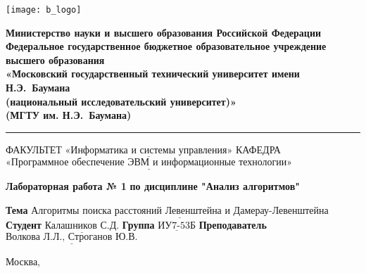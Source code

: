 \thispagestyle{empty}

\noindent \begin{minipage}{0.15\textwidth}
	\texttt{[image: b\_logo]}
\end{minipage}
\noindent\begin{minipage}{0.8\textwidth}\centering
	\textbf{Министерство науки и высшего образования Российской Федерации}\\
	\textbf{Федеральное государственное бюджетное образовательное учреждение высшего образования}\\
	\textbf{«Московский государственный технический университет имени Н.Э.~Баумана}\\
	\textbf{(национальный исследовательский университет)»}\\
	\textbf{(МГТУ им. Н.Э.~Баумана)}
\end{minipage}

\noindent\rule{18cm}{3pt}
\newline\newline
\noindent ФАКУЛЬТЕТ $\underline{\text{«Информатика и системы управления»}}$ \newline\newline
\noindent КАФЕДРА $\underline{\text{«Программное обеспечение ЭВМ и информационные технологии»}}$\newline\newline\newline


\begin{center}
	\noindent\begin{minipage}{1.3\textwidth}\centering
		\Large\textbf{  Лабораторная работа № 1}\newline
		\textbf{по дисциплине "Анализ алгоритмов"}\newline\newline
	\end{minipage}
\end{center}

\noindent\textbf{Тема} $\underline{\text{Алгоритмы поиска расстояний Левенштейна и Дамерау-Левенштейна}}$\newline\newline
\noindent\textbf{Студент} $\underline{\text{Калашников С.Д.}}$\newline\newline
\noindent\textbf{Группа} $\underline{\text{ИУ7-53Б}}$\newline\newline
\noindent\textbf{Преподаватель} $\underline{\text{Волкова Л.Л., Строганов Ю.В.}}$\newline

\begin{center}
	\vfill
	Москва,~\the\year
\end{center}
\clearpage
